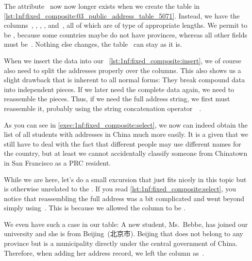The attribute~ now now longer exists when we create the table  in \cref{lst:1nf:fixed_composite:03_public_address_table_5071}.
Instead, we have the columns~, , , , and~, all of which are of type  of appropriate lengths.
We permit  to be , because some countries maybe do not have provinces, whereas all other fields must be~.
Nothing else changes, the table~ can stay as it is.

When we insert the data into our \db\ \cref{lst:1nf:fixed_composite:insert}, we of course also need to split the addresses properly over the columns.
This also shows us a slight drawback that is inherent to all normal forms:
They break compound data into independent pieces.
If we later need the complete data again, we need to reassemble the pieces.
Thus, if we need the full address string, we first must reassemble it, probably using the string concatenation operator~\sqlil{||}\sqlIdx{\textbar\textbar}~\cite{PGDG:PD:SFAO}.

As you can see in \cref{exec:1nf:fixed_composite:select}, we now can indeed obtain the list of all students with addresses in China much more easily.
It is a given that we still have to deal with the fact that different people may use different names for the country, but at least we cannot accidentally classify someone from Chinatown in San Francisco as a PRC resident.

While we are here, let's do a small excursion that just fits nicely in this topic but is otherwise unrelated to the .
If you read \cref{lst:1nf:fixed_composite:select}, you notice that reassembling the full address was a bit complicated and went beyond simply using~\sqlil{||}\sqlIdx{\textbar\textbar}.
This is because we allowed the  column to be .

We even have such a case in our table:
A new student, Ms.~Bebbe, has joined our university and she is from Beijing~(北京市).
Beijing that does not belong to any province but is a municipality directly under the central government of China.
Therefore, when adding her address record, we left the  column as~.

